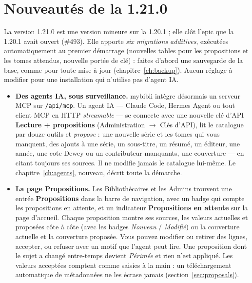 \section{Nouveautés de la 1.21.0}\label{sec:whats-new-1.21.0}

La version 1.21.0 est une version mineure sur la 1.20.1 ; elle clôt
l'epic que la 1.20.1 avait ouvert (\#493). Elle apporte \emph{six
migrations additives}, exécutées automatiquement au premier démarrage
(nouvelles tables pour les propositions et les tomes attendus, nouvelle
portée de clé) : faites d'abord une sauvegarde de la base, comme pour
toute mise à jour (chapitre~\ref{ch:backup}). Aucun réglage à modifier
pour une installation qui n'utilise pas d'agent IA.

\begin{itemize}
  \item \textbf{Des agents IA, sous surveillance.} mybibli intègre
        désormais un serveur MCP sur \texttt{/api/mcp}. Un agent IA ---
        Claude Code, Hermes Agent ou tout client MCP en HTTP
        \emph{streamable} --- se connecte avec une nouvelle clé d'API
        \textbf{Lecture + propositions} (Administration
        \(\rightarrow\) Clés d'API), lit le catalogue par douze outils
        et \emph{propose} : une nouvelle série et les tomes qui vous
        manquent, des ajouts à une série, un sous-titre, un résumé, un
        éditeur, une année, une cote Dewey ou un contributeur
        manquants, une couverture --- en citant toujours ses sources.
        Il ne modifie jamais le catalogue lui-même. Le
        chapitre~\ref{ch:agents}, nouveau, décrit toute la démarche.
  \item \textbf{La page Propositions.} Les Bibliothécaires et les
        Admins trouvent une entrée \textbf{Propositions} dans la barre
        de navigation, avec un badge qui compte les propositions en
        attente, et un indicateur \textbf{Propositions en attente} sur
        la page d'accueil. Chaque proposition montre ses sources, les
        valeurs actuelles et proposées côte à côte (avec les badges
        \emph{Nouveau} / \emph{Modifié}) ou la couverture actuelle et
        la couverture proposée. Vous pouvez modifier ou retirer des
        lignes, accepter, ou refuser avec un motif que l'agent peut
        lire. Une proposition dont le sujet a changé entre-temps devient
        \emph{Périmée} et rien n'est appliqué. Les valeurs acceptées
        comptent comme saisies à la main : un téléchargement
        automatique de métadonnées ne les écrase jamais
        (section~\ref{sec:proposals}).

\end{itemize}
